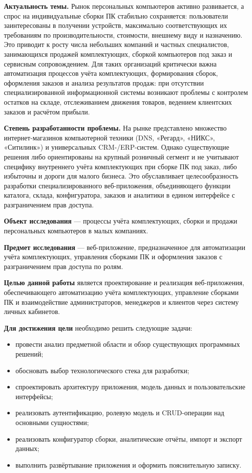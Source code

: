 \documentclass[14pt, a4paper]{extarticle}
\begin{document}
\textbf{Актуальность темы.} Рынок персональных компьютеров активно развивается, а спрос на индивидуальные сборки ПК стабильно сохраняется: пользователи заинтересованы в получении устройств, максимально соответствующих их требованиям по производительности, стоимости, внешнему виду и назначению. Это приводит к росту числа небольших компаний и частных специалистов, занимающихся продажей комплектующих, сборкой компьютеров под заказ и сервисным сопровождением. Для таких организаций критически важна автоматизация процессов учёта комплектующих, формирования сборок, оформления заказов и анализа результатов продаж: при отсутствии специализированной информационной системы возникают проблемы с контролем остатков на складе, отслеживанием движения товаров, ведением клиентских заказов и расчётом прибыли.

\textbf{Степень разработанности проблемы.} На рынке представлено множество интернет-магазинов компьютерной техники (DNS, «Регард», «НИКС», «Ситилинк») и универсальных CRM-/ERP-систем. Однако существующие решения либо ориентированы на крупный розничный сегмент и не учитывают специфику внутреннего учёта комплектующих при сборке ПК под заказ, либо избыточны и дороги для малого бизнеса. Это обуславливает целесообразность разработки специализированного веб-приложения, объединяющего функции каталога, склада, конфигуратора, заказов и аналитики в едином интерфейсе с разграничением прав доступа.

\textbf{Объект исследования} --- процессы учёта комплектующих, сборки и продажи персональных компьютеров в малых компаниях.

\textbf{Предмет исследования} --- веб-приложение, предназначенное для автоматизации учёта комплектующих, управления сборками ПК и оформления заказов с разграничением прав доступа по ролям.

\textbf{Целью данной работы} является проектирование и реализация веб-приложения, обеспечивающего автоматизацию учёта комплектующих, управление сборками ПК и взаимодействие администраторов, менеджеров и клиентов через систему личных кабинетов.

\textbf{Для достижения цели} необходимо решить следующие задачи:
\begin{itemize}
    \item провести анализ предметной области и обзор существующих программных решений;
    \item обосновать выбор технологического стека для разработки;
    \item спроектировать архитектуру приложения, модель данных и пользовательские интерфейсы;
    \item реализовать аутентификацию, ролевую модель и CRUD-операции над основными сущностями;
    \item реализовать конфигуратор сборки, аналитические отчёты, импорт и экспорт данных;
    \item выполнить развёртывание приложения и оформить пояснительную записку.
\end{itemize}
\end{document}
